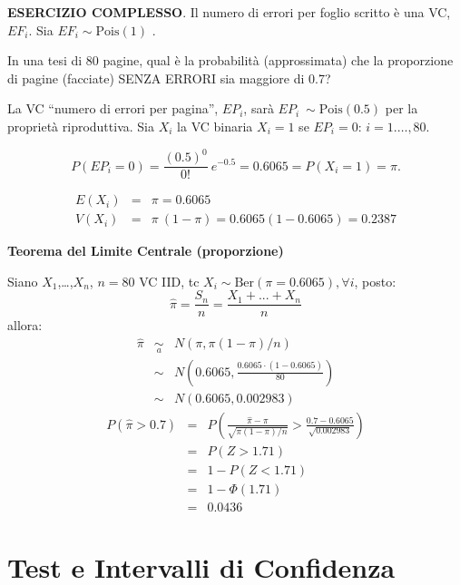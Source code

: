 \documentclass[
  11pt,
]{book}
\theoremstyle{mytheoremstyle}
\theoremstyle{mydefstyle}
\newenvironment{sol}
  {
  \begin{tcolorbox}[enhanced,breakable,arc=0.1mm,boxrule=1pt,colback=white,colframe=iblue,
  title=\bf \fontfamily{lmss}\selectfont \hspace{.5 cm} Soluzione,drop fuzzy shadow]

}{
\end{tcolorbox}
  }
\begin{document}
\textbf{ESERCIZIO COMPLESSO}. Il numero di errori per foglio scritto è una
VC, \(EF_i\). Sia \(EF_i \sim\text{Pois}(1)\) .

In una tesi di 80 pagine, qual è la probabilità (approssimata) che la
proporzione di pagine (facciate) SENZA ERRORI sia maggiore di 0.7?

\begin{sol}
La VC ``numero di errori per pagina'', \(EP_i\), sarà \(EP_{i}\ \sim\text{Pois}(0.5)\)
per la proprietà riproduttiva. Sia \(X_{i}\) la VC binaria \(X_{i}=1\) se \(EP_i=0\): \(i=1.\ldots, 80\).

\[
P(EP_{i}=0) = \frac{(0.5)^{0}} {0!}\ e^{-0.5} = 0.6065
               = P(X_{i}=1) =\pi  .
\]

\begin{eqnarray*}
E(X_i) &=& \pi = 0.6065                                                            \\
V(X_i) &=& \pi\ (1-\pi) = 0.6065 (1 - 0.6065) = 0.2387               
\end{eqnarray*}

\textbf{Teorema del Limite Centrale (proporzione)}

Siano \(X_1\),\ldots,\(X_n\), \(n=80\) VC IID, tc \(X_i\sim\text{Ber}(\pi=0.6065)\)\(,\forall i\), posto:
\[
      \hat\pi=\frac{S_n}n = \frac{X_1 + ... + X_n}n
      \]
allora:\begin{eqnarray*}
  \hat\pi & \mathop{\sim}\limits_{a}& N(\pi,\pi(1-\pi)/n) \\
  &\sim & N\left(0.6065,\frac{0.6065\cdot(1-0.6065)}{80}\right) \\
     &\sim & N(0.6065,0.002983) 
  \end{eqnarray*}\begin{eqnarray*}
      P( \hat\pi   >   0.7 ) 
        &=& P\left(  \frac { \hat\pi  -  \pi }{ \sqrt{\pi(1-\pi)/n} }  >  \frac { 0.7  -  0.6065 }{\sqrt{ 0.002983 }} \right)  \\
                 &=& P\left(  Z   >   1.71 \right) \\    &=& 1-P(Z< 1.71 )\\ 
                 &=&  1-\Phi( 1.71 ) \\ &=&  0.0436 
      \end{eqnarray*}

\end{sol}

\chapter{Test e Intervalli di Confidenza}\label{test-e-intervalli-di-confidenza}
\end{document}
